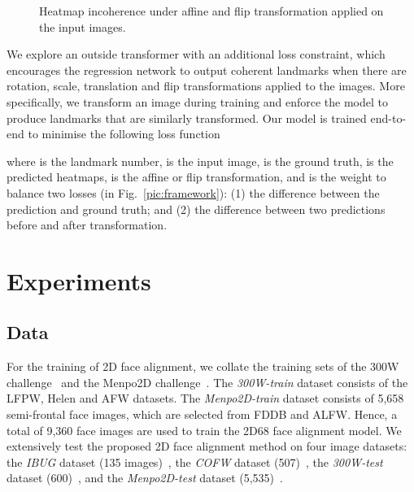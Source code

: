 \documentclass{bmvc2k}
\begin{document}
\begin{figure*}[h!]
\centering
{}
\caption{Heatmap incoherence under affine and flip transformation applied on the input images.}
\vspace{-4mm}
\label{fig:loss}
\end{figure*}

We explore an outside transformer with an additional loss constraint, which encourages the regression network to output coherent landmarks when there are rotation, scale, translation and flip transformations applied to the images. More specifically, we transform an image during training and enforce the model to produce landmarks that are similarly transformed. Our model is trained end-to-end to minimise the following loss function

where  is the landmark number,  is the input image,  is the ground truth,  is the predicted heatmaps,  is the affine or flip transformation, and  is the weight to balance two losses (in Fig.~\ref{pic:framework}): (1) the difference between the prediction and ground truth; and (2) the difference between two predictions before and after transformation.





\section{Experiments}

\subsection{Data}



For the training of 2D face alignment, we collate the training sets of the 300W challenge~\cite{sagonas2016300} and the Menpo2D challenge~\cite{stefanos2017menpo}. The {\em 300W-train} dataset consists of the LFPW, Helen and AFW datasets. The {\em Menpo2D-train} dataset consists of 5,658 semi-frontal face images, which are selected from FDDB and ALFW.
Hence, a total of 9,360 face images are used to train the 2D68 face alignment model.
We extensively test the proposed 2D face alignment method on four image datasets: 
the {\em IBUG} dataset (135 images)~\cite{sagonas2016300}, the {\em COFW} dataset (507)~\cite{burgos2013robust,ghiasi2015occlusion}, the {\em 300W-test} dataset (600)~\cite{sagonas2016300}, and the {\em Menpo2D-test} dataset (5,535)~\cite{stefanos2017menpo}.
\end{document}
